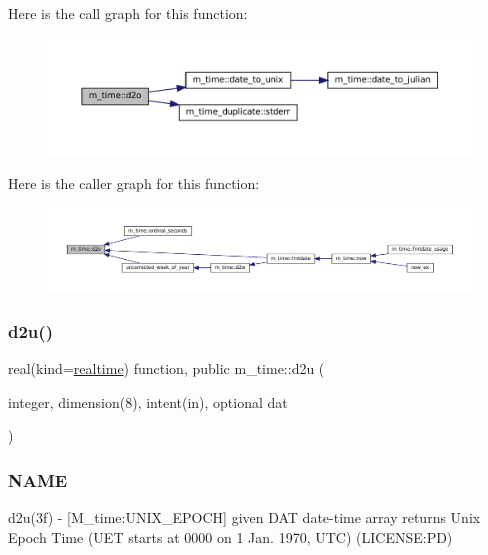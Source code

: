 Here is the call graph for this function\+:\nopagebreak
\begin{figure}[H]
\begin{center}
\leavevmode
\includegraphics[width=350pt]{namespacem__time_a727dd77bbd4a5d0e3947c5d303845947_cgraph}
\end{center}
\end{figure}
Here is the caller graph for this function\+:\nopagebreak
\begin{figure}[H]
\begin{center}
\leavevmode
\includegraphics[width=350pt]{namespacem__time_a727dd77bbd4a5d0e3947c5d303845947_icgraph}
\end{center}
\end{figure}
\mbox{\label{namespacem__time_a1506e2889a156387df4481ed0534be81}} 
\subsubsection{\texorpdfstring{d2u()}{d2u()}}
{\footnotesize\ttfamily real(kind=\mbox{\hyperlink{namespacem__time_ac10ea9e8d59ec74eaa7d89f2517d7422}{realtime}}) function, public m\+\_\+time\+::d2u (\begin{DoxyParamCaption}\item[{integer, dimension(8), intent(in), optional}]{dat }\end{DoxyParamCaption})}



\subsubsection*{N\+A\+ME}

d2u(3f) -\/ \mbox{[}M\+\_\+time\+:U\+N\+I\+X\+\_\+\+E\+P\+O\+CH\mbox{]} given D\+AT date-\/time array returns Unix Epoch Time (U\+ET starts at 0000 on 1 Jan. 1970, U\+TC) (L\+I\+C\+E\+N\+SE\+:PD) 

